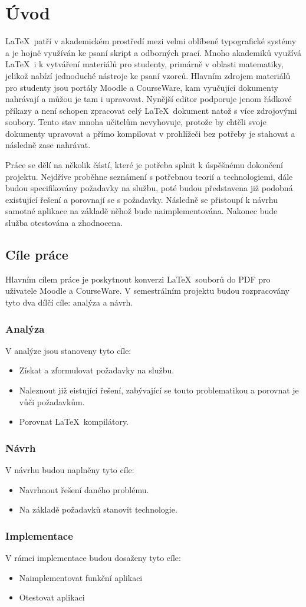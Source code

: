 \chapter{Úvod}
\LaTeX\ patří v akademickém prostředí mezi velmi oblíbené typografické systémy a je hojně využíván ke psaní skript a odborných prací. Mnoho akademiků využívá \LaTeX\ i k vytváření materiálů pro studenty, primárně v oblasti matematiky, jelikož nabízí jednoduché nástroje ke psaní vzorců. Hlavním zdrojem materiálů pro studenty jsou portály Moodle a CourseWare, kam vyučující dokumenty nahrávají a můžou je tam i upravovat. Nynější editor podporuje jenom řádkové příkazy a není schopen zpracovat celý \LaTeX\ dokument natož s více zdrojovými soubory. Tento stav mnoha učitelům nevyhovuje, protože by chtěli svoje dokumenty upravovat a přímo kompilovat v prohlížeči bez potřeby je stahovat a následně zase nahrávat. 

Práce se dělí na několik částí, které je potřeba splnit k úspěšnému dokončení projektu. Nejdříve proběhne seznámení s potřebnou teorií a technologiemi, dále budou specifikovány požadavky na službu, poté budou představena již podobná existující řešení a porovnají se s požadavky. Následně se přistoupí k návrhu samotné aplikace na základě něhož bude naimplementována. Nakonec bude služba otestována a zhodnocena.


\section{Cíle práce}
Hlavním cílem práce je poskytnout konverzi \LaTeX\ souborů do PDF pro uživatele Moodle a CourseWare. V semestrálním projektu budou rozpracovány tyto dva dílčí cíle: analýza a návrh.

\subsection{Analýza} 
V analýze jsou stanoveny tyto cíle:

\begin{itemize}
	\item Získat a zformulovat požadavky na službu.
	\item Naleznout již eistující řešení, zabývající se touto problematikou a porovnat je vůči požadavkům.
	\item Porovnat \LaTeX\ kompilátory. 
\end{itemize}
\newpage
\subsection{Návrh}
V návrhu budou naplněny tyto cíle:

\begin{itemize}
	\item Navrhnout řešení daného problému. 
	\item Na základě požadavků stanovit technologie.
\end{itemize}

\subsection{Implementace}
V rámci implementace budou dosaženy tyto cíle:

\begin{itemize}
	\item Naimplementovat funkční aplikaci
	\item Otestovat aplikaci
\end{itemize}



